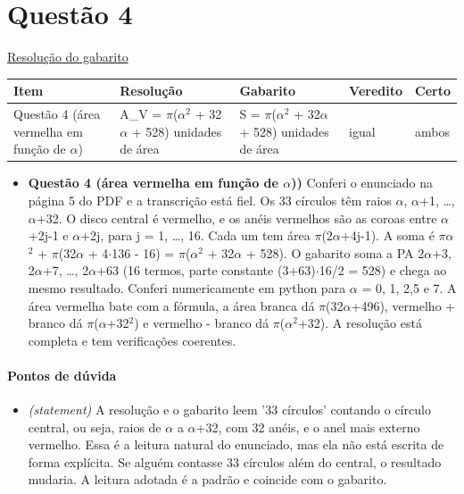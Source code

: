 \documentclass{article}%
\begin{document}
\section*{Questão 4}%
\href{https://poliedroresolve.sistemapoliedro.com.br/vestibulares/ita/2026/ita-2-fase-dia-1-28-10-2025-2-fase-dia-1/dissertativa-4-matematica-2-fase-dia-1-ita-2026}{Resolução do gabarito}\par\smallskip%
\begin{longtable}{@{}p{} p{} p{} p{} p{}@{}}\toprule Item & Resolução & Gabarito & Veredito & Certo \\ \midrule
Questão 4 (área vermelha em função de $\alpha$) & A\_V = $\pi$($\alpha$$^2$ + 32$\alpha$ + 528) unidades de área & S = $\pi$($\alpha$$^2$ + 32$\alpha$ + 528) unidades de área & igual & ambos \\
\bottomrule\end{longtable}%
\begin{itemize}%
\item%
\textbf{Questão 4 (área vermelha em função de $\alpha$))} Conferi o enunciado na página 5 do PDF e a transcrição está fiel. Os 33 círculos têm raios $\alpha$, $\alpha$+1, \ldots{}, $\alpha$+32. O disco central é vermelho, e os anéis vermelhos são as coroas entre $\alpha$+2j-1 e $\alpha$+2j, para j = 1, \ldots{}, 16. Cada um tem área $\pi$(2$\alpha$+4j-1). A soma é $\pi$$\alpha$$^2$ + $\pi$(32$\alpha$ + 4$\cdot$136 - 16) = $\pi$($\alpha$$^2$ + 32$\alpha$ + 528). O gabarito soma a PA 2$\alpha$+3, 2$\alpha$+7, \ldots{}, 2$\alpha$+63 (16 termos, parte constante (3+63)$\cdot$16/2 = 528) e chega ao mesmo resultado. Conferi numericamente em python para $\alpha$ = 0, 1, 2,5 e 7. A área vermelha bate com a fórmula, a área branca dá $\pi$(32$\alpha$+496), vermelho + branco dá $\pi$($\alpha$+32$^2$) e vermelho - branco dá $\pi$($\alpha$$^2$+32). A resolução está completa e tem verificações coerentes.%
\end{itemize}%
\paragraph{Pontos de dúvida}%
\begin{itemize}%
\item%
\textit{(statement)} A resolução e o gabarito leem '33 círculos' contando o círculo central, ou seja, raios de $\alpha$ a $\alpha$+32, com 32 anéis, e o anel mais externo vermelho. Essa é a leitura natural do enunciado, mas ela não está escrita de forma explícita. Se alguém contasse 33 círculos além do central, o resultado mudaria. A leitura adotada é a padrão e coincide com o gabarito.%
\end{itemize}%
\end{document}
